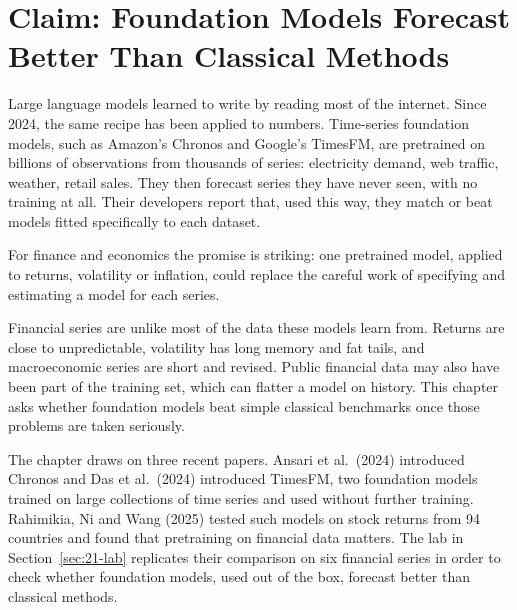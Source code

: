 \makeatletter
{}
\makeatother

\chapter{Claim: Foundation Models Forecast Better Than Classical Methods}
\label{ch:21}

Large language models learned to write by reading most of the internet. Since 2024, the same recipe has been applied to numbers. Time-series foundation models, such as Amazon's Chronos and Google's TimesFM, are pretrained on billions of observations from thousands of series: electricity demand, web traffic, weather, retail sales. They then forecast series they have never seen, with no training at all. Their developers report that, used this way, they match or beat models fitted specifically to each dataset.

For finance and economics the promise is striking: one pretrained model, applied to returns, volatility or inflation, could replace the careful work of specifying and estimating a model for each series.

Financial series are unlike most of the data these models learn from. Returns are close to unpredictable, volatility has long memory and fat tails, and macroeconomic series are short and revised. Public financial data may also have been part of the training set, which can flatter a model on history. This chapter asks whether foundation models beat simple classical benchmarks once those problems are taken seriously.

The chapter draws on three recent papers. Ansari et al.\ (2024) introduced Chronos and Das et al.\ (2024) introduced TimesFM, two foundation models trained on large collections of time series and used without further training. Rahimikia, Ni and Wang (2025) tested such models on stock returns from 94 countries and found that pretraining on financial data matters. The lab in Section~\ref{sec:21-lab} replicates their comparison on six financial series in order to check whether foundation models, used out of the box, forecast better than classical methods.

